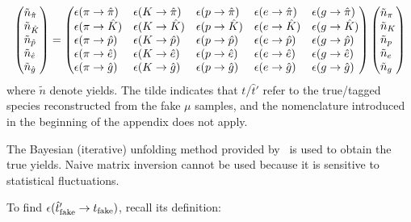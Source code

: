 \begin{equation}
    \begin{pmatrix*}[l]
        \tilde{n}_{\hat{\pi}} \\
        \tilde{n}_{\hat{K}}   \\
        \tilde{n}_{\hat{p}}   \\
        \tilde{n}_{\hat{e}}   \\
        \tilde{n}_{\hat{g}}   \\
    \end{pmatrix*}
    =
    \begin{pmatrix*}[l]
        \misEff[\pi]{\hat{\pi}} & \misEff[K]{\hat{\pi}} & \misEff[p]{\hat{\pi}} & \misEff[e]{\hat{\pi}} & \misEff[g]{\hat{\pi}} \\
        \misEff[\pi]{\hat{K}}   & \misEff[K]{\hat{K}}   & \misEff[p]{\hat{K}}   & \misEff[e]{\hat{K}}   & \misEff[g]{\hat{K}}   \\
        \misEff[\pi]{\hat{p}}   & \misEff[K]{\hat{p}}   & \misEff[p]{\hat{p}}   & \misEff[e]{\hat{p}}   & \misEff[g]{\hat{p}}   \\
        \misEff[\pi]{\hat{e}}   & \misEff[K]{\hat{e}}   & \misEff[p]{\hat{e}}   & \misEff[e]{\hat{e}}   & \misEff[g]{\hat{e}}   \\
        \misEff[\pi]{\hat{g}}   & \misEff[K]{\hat{g}}   & \misEff[p]{\hat{g}}   & \misEff[e]{\hat{g}}   & \misEff[g]{\hat{g}}   \\
    \end{pmatrix*}
    \begin{pmatrix*}[l]
        \tilde{n}_{{\pi}} \\
        \tilde{n}_{{K}}   \\
        \tilde{n}_{{p}}   \\
        \tilde{n}_{{e}}   \\
        \tilde{n}_{{g}}   \\
    \end{pmatrix*}
\end{equation}
where $\tilde{n}$ denote yields. The tilde indicates that $t/\hat{t}'$ refer to
the true/tagged species reconstructed from the fake $\mu$ samples,
and the nomenclature introduced in the beginning of the appendix does not apply.

The Bayesian (iterative) unfolding method provided by \RooUnfold\ is used to
obtain the true yields.
Naive matrix inversion cannot be used because it is sensitive to statistical
fluctuations.  %

To find $\misEff[\hat{t}_\text{fake}']{t_\text{fake}}$, recall its definition:

